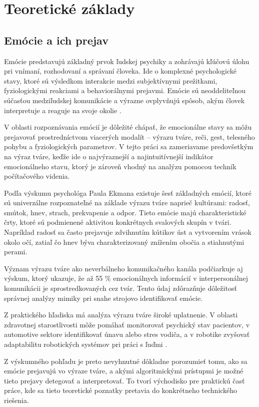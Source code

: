 \section{Teoretické základy}
\subsection{Emócie a ich prejav}
Emócie predstavujú základný prvok ľudskej psychiky a zohrávajú kľúčovú úlohu pri vnímaní, rozhodovaní a správaní človeka. Ide o komplexné psychologické stavy, ktoré sú výsledkom interakcie medzi subjektívnymi prežitkami, 
fyziologickými reakciami a behaviorálnymi prejavmi. 
Emócie sú neoddeliteľnou súčasťou medziľudskej komunikácie a výrazne ovplyvňujú spôsob, akým človek interpretuje a reaguje na svoje okolie \cite{article01}.

V oblasti rozpoznávania emócií je dôležité chápať, že emocionálne stavy sa môžu prejavovať prostredníctvom viacerých modalít – výrazu tváre, reči, gest, telesného pohybu a fyziologických parametrov. 
V tejto práci sa zameriavame predovšetkým na výraz tváre, keďže ide o najvýraznejší a najintuitívnejší 
indikátor emocionálneho stavu, ktorý je zároveň vhodný na analýzu pomocou techník počítačového videnia.

Podľa výskumu psychológa Paula Ekmana existuje šesť základných emócií, ktoré sú univerzálne rozpoznateľné na základe výrazu tváre naprieč kultúrami: radosť, smútok, hnev, strach, prekvapenie a odpor. 
Tieto emócie majú charakteristické črty, ktoré sú podmienené aktivitou konkrétnych svalových skupín v tvári. 
Napríklad radosť sa často prejavuje zdvihnutím kútikov úst a vytvorením vrások okolo očí, zatiaľ čo hnev býva charakterizovaný znížením obočia a stiahnutými perami.

Význam výrazu tváre ako neverbálneho komunikačného kanála podčiarkuje aj výskum, ktorý ukazuje, že až 55 \% emocionálnych informácií v interpersonálnej komunikácii je sprostredkovaných cez tvár. 
Tento údaj zdôrazňuje dôležitosť správnej analýzy mimiky pri snahe strojovo identifikovať emócie.

Z praktického hľadiska má analýza výrazu tváre široké uplatnenie. V oblasti zdravotnej starostlivosti môže pomáhať monitorovať psychický stav pacientov, v automotive sektore identifikovať únavu alebo stres vodiča, 
a v robotike zvyšovať adaptabilitu robotických systémov pri práci s ľuďmi .

Z výskumného pohľadu je preto nevyhnutné dôkladne porozumieť tomu, ako sa emócie prejavujú vo výraze tváre, a akými algoritmickými prístupmi je možné tieto prejavy detegovať a interpretovať. To tvorí východisko pre praktickú časť práce, 
kde sa tieto teoretické poznatky pretavia do konkrétneho technického riešenia.
